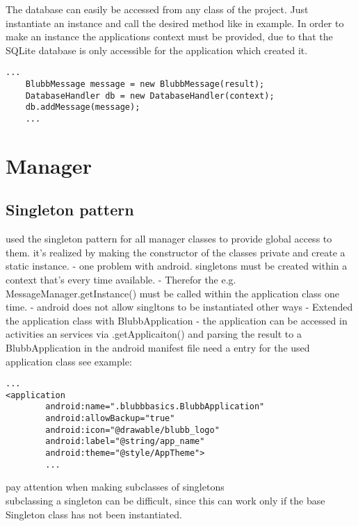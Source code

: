 \documentclass[12pt,a4paper,oneside]{report}
\begin{document}
The database can easily be accessed from any class of the project. Just instantiate an instance and call the desired method like in example. In order to make an instance the applications context must be provided, due to that the SQLite database is only accessible for the application which created it.
\begin{lstlisting}[caption=Accessing the SQLite database]
	...
	BlubbMessage message = new BlubbMessage(result);
	DatabaseHandler db = new DatabaseHandler(context);
	db.addMessage(message);
	...
\end{lstlisting}
\label{SQLiteAccessExample}

\section{Manager}

\subsection{Singleton pattern}
used the singleton pattern for all manager classes to provide global access to them. it's realized by making the constructor of the classes private and create a static instance. 
\citep[p. 39]{cooper2000java}
- one problem with android. singletons must be created within a context that's every time available.
- Therefor the e.g. MessageManager.getInstance() must be called within the application class one time. 
- android does not allow singltons to be instantiated other ways 
- Extended the application class with BlubbApplication
- the application can be accessed in activities an services via .getApplicaiton() and parsing the result to a BlubbApplication
in the android manifest file need a entry for the used application class see example:

\lstset{language=xml}
\begin{lstlisting}[caption=Application tag of the manifest.xml]
...
<application
        android:name=".blubbbasics.BlubbApplication"
        android:allowBackup="true"
        android:icon="@drawable/blubb_logo"
        android:label="@string/app_name"
        android:theme="@style/AppTheme">
        ...
\end{lstlisting}
\label{lst:AppTagManifest}

\lstset{language=java}
pay attention when making subclasses of singletons
\\subclassing a singleton can be difficult, since this can work only if the base Singleton class has not been instantiated. \citep[p. 46]{cooper2000java} 
\end{document}

